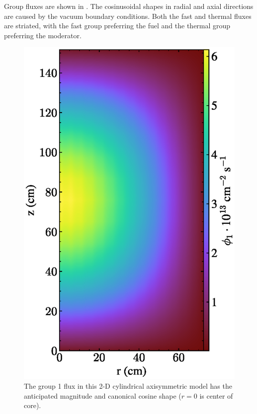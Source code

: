 \documentclass{article}
\begin{document}
Group fluxes are shown in . The cosinusoidal shapes 
in radial and
axial directions are caused by the vacuum boundary conditions. Both the fast and thermal fluxes are striated, with
the fast group preferring the fuel and the thermal group preferring the moderator.

\begin{figure}[htpb]
  \centering
  \includegraphics{2d_gamma_heating_group1.eps}
        \caption{The group 1 flux in this 2-D cylindrical axisymmetric model
        has the anticipated magnitude and canonical cosine shape ($r=0$ is center of core). }
  \label{fig:group1}
\end{figure}
\end{document}
